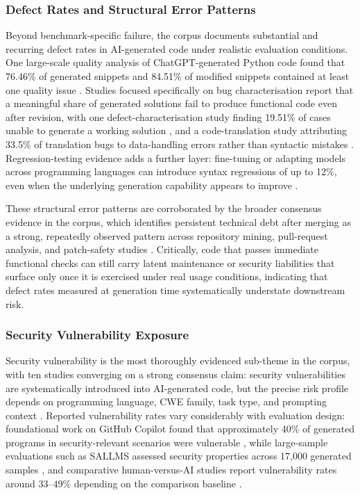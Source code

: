 \subsubsection{Defect Rates and Structural Error Patterns}
\label{sec:cqtd-defects}
Beyond benchmark-specific failure, the corpus documents substantial and recurring defect rates in AI-generated code under realistic evaluation conditions. One large-scale quality analysis of ChatGPT-generated Python code found that 76.46\% of generated snippets and 84.51\% of modified snippets contained at least one quality issue \cite{rabbi_ai_2024}. Studies focused specifically on bug characterisation report that a meaningful share of generated solutions fail to produce functional code even after revision, with one defect-characterisation study finding 19.51\% of cases unable to generate a working solution \cite{esfahani_understanding_2024}, and a code-translation study attributing 33.5\% of translation bugs to data-handling errors rather than syntactic mistakes \cite{pan_lost_2024}. Regression-testing evidence adds a further layer: fine-tuning or adapting models across programming languages can introduce syntax regressions of up to 12\%, even when the underlying generation capability appears to improve \cite{abbassi_recatcher_2025}.

These structural error patterns are corroborated by the broader consensus evidence in the corpus, which identifies persistent technical debt after merging as a strong, repeatedly observed pattern across repository mining, pull-request analysis, and patch-safety studies \cite{liu_debt_2026,borg_echoes_2026,siddiq_quality_2024,cotroneo_devaic_2025,sajadi_how_2025,fu_security_2025,schreiber_security_2026}. Critically, code that passes immediate functional checks can still carry latent maintenance or security liabilities that surface only once it is exercised under real usage conditions, indicating that defect rates measured at generation time systematically understate downstream risk.

\subsubsection{Security Vulnerability Exposure}
\label{sec:cqtd-security}
Security vulnerability is the most thoroughly evidenced sub-theme in the corpus, with ten studies converging on a strong consensus claim: security vulnerabilities are systematically introduced into AI-generated code, but the precise risk profile depends on programming language, CWE family, task type, and prompting context \cite{pearce_asleep_2025,siddiq_generate_2023,schreiber_security_2026,asare_is_2024,alrashedy_can_2024,fu_security_2025,dozono_large_2026,tony_prompting_2025,res_enhancing_2024,asare_user-centered_2024}. Reported vulnerability rates vary considerably with evaluation design: foundational work on GitHub Copilot found that approximately 40\% of generated programs in security-relevant scenarios were vulnerable \cite{pearce_asleep_2025}, while large-sample evaluations such as SALLMS assessed security properties across 17,000 generated samples \cite{siddiq_generate_2023}, and comparative human-versus-AI studies report vulnerability rates around 33--49\% depending on the comparison baseline \cite{asare_is_2024}.

